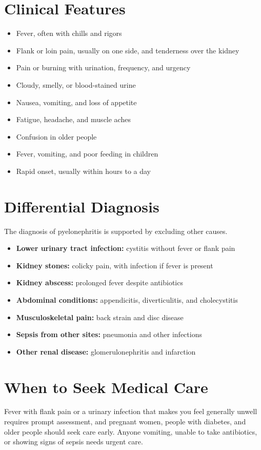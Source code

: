\section*{Clinical Features}
\begin{itemize}
    \item Fever, often with chills and rigors
    \item Flank or loin pain, usually on one side, and tenderness over the kidney
    \item Pain or burning with urination, frequency, and urgency
    \item Cloudy, smelly, or blood-stained urine
    \item Nausea, vomiting, and loss of appetite
    \item Fatigue, headache, and muscle aches
    \item Confusion in older people
    \item Fever, vomiting, and poor feeding in children
    \item Rapid onset, usually within hours to a day
\end{itemize}

\section*{Differential Diagnosis}
The diagnosis of pyelonephritis is supported by excluding other causes.
\begin{itemize}
    \item \textbf{Lower urinary tract infection:} cystitis without fever or flank pain
    \item \textbf{Kidney stones:} colicky pain, with infection if fever is present
    \item \textbf{Kidney abscess:} prolonged fever despite antibiotics
    \item \textbf{Abdominal conditions:} appendicitis, diverticulitis, and cholecystitis
    \item \textbf{Musculoskeletal pain:} back strain and disc disease
    \item \textbf{Sepsis from other sites:} pneumonia and other infections
    \item \textbf{Other renal disease:} glomerulonephritis and infarction
\end{itemize}

\section*{When to Seek Medical Care}
Fever with flank pain or a urinary infection that makes you feel generally unwell requires prompt assessment, and pregnant women, people with diabetes, and older people should seek care early. Anyone vomiting, unable to take antibiotics, or showing signs of sepsis needs urgent care.

